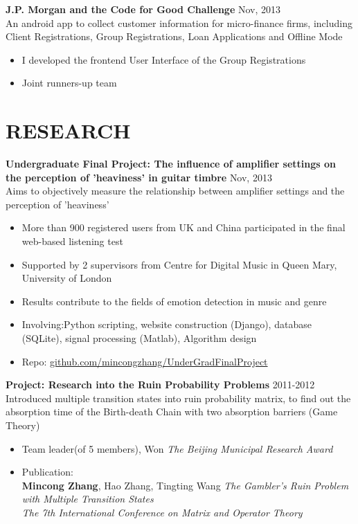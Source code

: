 \documentclass[line,margin]{res}
\begin{document}
\begin{resume}
{\bf J.P. Morgan and the Code for Good Challenge}
\hfill{\textcolor[rgb]{0.7,0.7,0.7}{Nov, 2013}}\\
An android app to collect customer information for micro-ﬁnance ﬁrms, including Client Registrations, Group Registrations, Loan Applications and Offline Mode
\begin{itemize}\itemsep -2pt %
    \item I developed the frontend User Interface of the Group Registrations
    \item Joint runners-up team
\end{itemize}

\section{RESEARCH} 
{\bf Undergraduate Final Project: The influence of amplifier settings on the perception of 'heaviness' in guitar timbre}
\hfill{\textcolor[rgb]{0.7,0.7,0.7}{Nov, 2013}}\\
Aims to objectively measure the relationship between amplifier settings and the perception of 'heaviness'
\begin{itemize}\itemsep -2pt %
    \item More than 900 registered users from UK and China participated in the final web-based listening test
    \item Supported by 2 supervisors from Centre for Digital Music in Queen Mary, University of London
    \item Results contribute to the fields of emotion detection in music and genre
    \item Involving:Python scripting, website construction (Django), database (SQLite), signal processing (Matlab), Algorithm design
    \item Repo: \href{https://github.com/mincongzhang/UnderGradFinalProject}{github.com/mincongzhang/UnderGradFinalProject}
\end{itemize}

{\bf Project: Research into the Ruin Probability Problems}
\hfill{\textcolor[rgb]{0.7,0.7,0.7}{2011-2012}}\\
Introduced multiple transition states into ruin probability matrix, to find out the absorption time of the Birth-death Chain with two absorption barriers (Game Theory)
\begin{itemize}\itemsep -2pt %
    \item Team leader(of 5 members), Won \emph{The Beijing Municipal Research Award}
    \item Publication:\\
\textbf{Mincong Zhang}, Hao Zhang, Tingting Wang   \emph{The Gambler's Ruin Problem with Multiple Transition States}\\
\emph{The 7th International Conference on Matrix and Operator Theory}
\end{itemize}


\end{resume}
\end{document}
